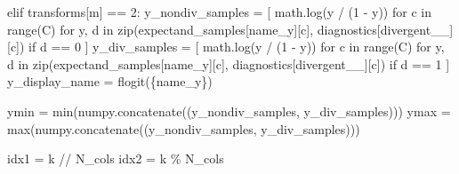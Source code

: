 \documentclass[
  letterpaper,
  DIV=11,
  numbers=noendperiod]{scrartcl}
\newenvironment{Shaded}{\begin{snugshade}}{\end{snugshade}}
\newcommand{\BuiltInTok}[1]{\textcolor[rgb]{0.00,0.23,0.31}{#1}}
\newcommand{\ControlFlowTok}[1]{\textcolor[rgb]{0.00,0.23,0.31}{#1}}
\newcommand{\DecValTok}[1]{\textcolor[rgb]{0.68,0.00,0.00}{#1}}
\newcommand{\KeywordTok}[1]{\textcolor[rgb]{0.00,0.23,0.31}{#1}}
\newcommand{\NormalTok}[1]{\textcolor[rgb]{0.00,0.23,0.31}{#1}}
\newcommand{\OperatorTok}[1]{\textcolor[rgb]{0.37,0.37,0.37}{#1}}
\newcommand{\SpecialCharTok}[1]{\textcolor[rgb]{0.37,0.37,0.37}{#1}}
\newcommand{\SpecialStringTok}[1]{\textcolor[rgb]{0.13,0.47,0.30}{#1}}
\newcommand{\StringTok}[1]{\textcolor[rgb]{0.13,0.47,0.30}{#1}}
\begin{document}
\begin{Shaded}
\begin{Highlighting}[]
      \ControlFlowTok{elif}\NormalTok{ transforms[m] }\OperatorTok{==} \DecValTok{2}\NormalTok{:}
\NormalTok{        y\_nondiv\_samples }\OperatorTok{=}\NormalTok{ [ math.log(y }\OperatorTok{/}\NormalTok{ (}\DecValTok{1} \OperatorTok{{-}}\NormalTok{ y)) }
                             \ControlFlowTok{for}\NormalTok{ c }\KeywordTok{in} \BuiltInTok{range}\NormalTok{(C) }\ControlFlowTok{for}\NormalTok{ y, d }\KeywordTok{in} 
                             \BuiltInTok{zip}\NormalTok{(expectand\_samples[name\_y][c], }
\NormalTok{                                 diagnostics[}\StringTok{\textquotesingle{}divergent\_\_\textquotesingle{}}\NormalTok{][c]) }
                             \ControlFlowTok{if}\NormalTok{ d }\OperatorTok{==} \DecValTok{0}\NormalTok{  ]}
\NormalTok{        y\_div\_samples }\OperatorTok{=}\NormalTok{ [ math.log(y }\OperatorTok{/}\NormalTok{ (}\DecValTok{1} \OperatorTok{{-}}\NormalTok{ y)) }
                          \ControlFlowTok{for}\NormalTok{ c }\KeywordTok{in} \BuiltInTok{range}\NormalTok{(C) }\ControlFlowTok{for}\NormalTok{ y, d }\KeywordTok{in} 
                          \BuiltInTok{zip}\NormalTok{(expectand\_samples[name\_y][c], }
\NormalTok{                              diagnostics[}\StringTok{\textquotesingle{}divergent\_\_\textquotesingle{}}\NormalTok{][c]) }
                          \ControlFlowTok{if}\NormalTok{ d }\OperatorTok{==} \DecValTok{1}\NormalTok{  ]}
\NormalTok{        y\_display\_name }\OperatorTok{=} \SpecialStringTok{f\textquotesingle{}logit(}\SpecialCharTok{\{}\NormalTok{name\_y}\SpecialCharTok{\}}\SpecialStringTok{)\textquotesingle{}}
              
\NormalTok{      ymin }\OperatorTok{=} \BuiltInTok{min}\NormalTok{(numpy.concatenate((y\_nondiv\_samples, y\_div\_samples)))}
\NormalTok{      ymax }\OperatorTok{=} \BuiltInTok{max}\NormalTok{(numpy.concatenate((y\_nondiv\_samples, y\_div\_samples)))}

\NormalTok{      idx1 }\OperatorTok{=}\NormalTok{ k }\OperatorTok{//}\NormalTok{ N\_cols}
\NormalTok{      idx2 }\OperatorTok{=}\NormalTok{ k }\OperatorTok{\%}\NormalTok{ N\_cols}
      

\end{Highlighting}
\end{Shaded}
\end{document}
